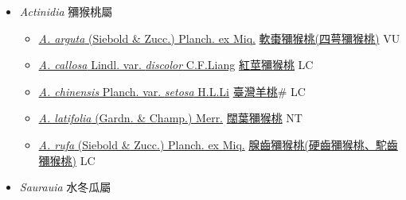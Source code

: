 
  \begin{itemize}
 \item[] \textit{Actinidia} 獼猴桃屬
                    
  \begin{itemize}
        \item[] \href{http://www.theplantlist.org/tpl1.1/search?q=Actinidia+arguta}{\textit{A. arguta} (Siebold \& Zucc.) Planch. ex Miq.}     \href{\detokenize{http://taibnet.sinica.edu.tw/chi/taibnet_species_list.php?T2=軟棗獼猴桃&T2_new_value=true&fr=y}}{軟棗獼猴桃(四萼獼猴桃)}   VU
        \item[] \href{http://www.theplantlist.org/tpl1.1/search?q=Actinidia+callosa+var.+discolor}{\textit{A. callosa} Lindl. var. \textit{discolor} C.F.Liang}     \href{\detokenize{http://taibnet.sinica.edu.tw/chi/taibnet_species_list.php?T2=紅莖獼猴桃&T2_new_value=true&fr=y}}{紅莖獼猴桃} LC
        \item[] \href{http://www.theplantlist.org/tpl1.1/search?q=Actinidia+chinensis+var.+setosa}{\textit{A. chinensis} Planch. var. \textit{setosa} H.L.Li}   \href{\detokenize{http://taibnet.sinica.edu.tw/chi/taibnet_species_list.php?T2=臺灣羊桃&T2_new_value=true&fr=y}}{臺灣羊桃}\# LC
        \item[] \href{http://www.theplantlist.org/tpl1.1/search?q=Actinidia+latifolia}{\textit{A. latifolia} (Gardn. \& Champ.) Merr.}   \href{\detokenize{http://taibnet.sinica.edu.tw/chi/taibnet_species_list.php?T2=闊葉獼猴桃&T2_new_value=true&fr=y}}{闊葉獼猴桃} NT
        \item[] \href{http://www.theplantlist.org/tpl1.1/search?q=Actinidia+rufa}{\textit{A. rufa} (Siebold \& Zucc.) Planch. ex Miq.}        \href{\detokenize{http://taibnet.sinica.edu.tw/chi/taibnet_species_list.php?T2=腺齒獼猴桃&T2_new_value=true&fr=y}}{腺齒獼猴桃(硬齒獼猴桃、駝齒獼猴桃)}    LC
  \end{itemize}
 \item[] \textit{Saurauia} 水冬瓜屬
                    

\end{itemize}
